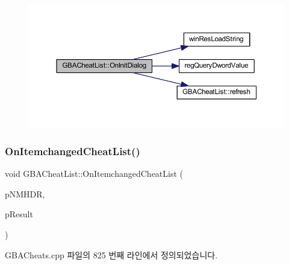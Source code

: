\nopagebreak
\begin{figure}[H]
\begin{center}
\leavevmode
\includegraphics[width=350pt]{class_g_b_a_cheat_list_ae6cfd528dfdae4f9e7f64df50a0771ed_cgraph}
\end{center}
\end{figure}
\mbox{\label{class_g_b_a_cheat_list_a64182036127e2c73d0c79706cc1f2d1e}} 
\subsubsection{\texorpdfstring{On\+Itemchanged\+Cheat\+List()}{OnItemchangedCheatList()}}
{\footnotesize\ttfamily void G\+B\+A\+Cheat\+List\+::\+On\+Itemchanged\+Cheat\+List (\begin{DoxyParamCaption}\item[{N\+M\+H\+DR $\ast$}]{p\+N\+M\+H\+DR,  }\item[{L\+R\+E\+S\+U\+LT $\ast$}]{p\+Result }\end{DoxyParamCaption})\hspace{0.3cm}{\ttfamily [protected]}}



G\+B\+A\+Cheats.\+cpp 파일의 825 번째 라인에서 정의되었습니다.


